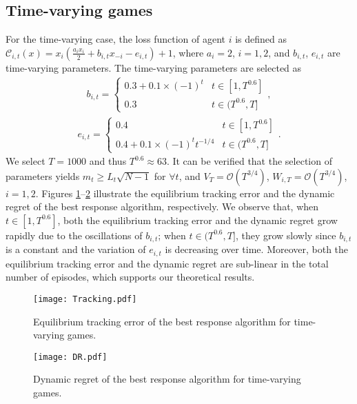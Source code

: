 \subsection{Time-varying games}
For the time-varying case, the loss function of agent $i$ is defined as $\mathcal{C}_{i,t}(x) = x_i(\frac{a_i x_i}{2} + b_{i,t} x_{-i} - e_{i,t})+ 1$, where $a_i=2$, $i=1,2$, and $b_{i,t}$, $e_{i,t}$ are time-varying parameters. The time-varying parameters are selected as 
\begin{align*}
    b_{i,t}=\left\{ \begin{array}{cc} 0.3+ 0.1\times (-1)^t  & t\in[1,T^{0.6}] \\
    0.3 & t\in(T^{0.6},T] \end{array},\right.
\end{align*}
\begin{align*}
    e_{i,t}=\left\{ \begin{array}{cc} 0.4 & t\in[1,T^{0.6}] \\
    0.4+ 0.1\times (-1)^t t^{-1/4}  & t\in(T^{0.6},T] \end{array}.\right.
\end{align*}
%
We select $T=1000$ and thus $T^{0.6}\approx63$.
It can be verified that the selection of parameters yields $m_t\geq L_t \sqrt{N-1}$ for $\forall t$, and $V_T = \mathcal{O}(T^{3/4})$, $W_{i,T} = \mathcal{O}(T^{3/4})$, $i=1,2$. Figures \ref{fig_tracking}--\ref{fig_DR}  illustrate the equilibrium tracking  error and the dynamic regret of the best response algorithm, respectively. We observe that, when $t\in[1,T^{0.6}]$, both the equilibrium tracking error and the dynamic regret grow rapidly due to the oscillations of $b_{i,t}$; when $t\in(T^{0.6},T]$, they grow slowly since $b_{i,t}$ is a constant and the variation of $e_{i,t}$ is decreasing over time.
Moreover, both the equilibrium tracking error and the dynamic regret are sub-linear in the total number of episodes, which supports our theoretical results.


\begin{figure}[t]
\begin{center}
\centerline{\texttt{[image: Tracking.pdf]}}
\caption{Equilibrium tracking error of the best response algorithm for time-varying games. }
\label{fig_tracking}
\end{center}
\vskip -0.3in
\end{figure}

\begin{figure}[t]
\begin{center}
\centerline{\texttt{[image: DR.pdf]}}
\caption{Dynamic regret of the best response algorithm for time-varying games.}
\label{fig_DR}
\end{center}
\vskip -0.3in
\end{figure}